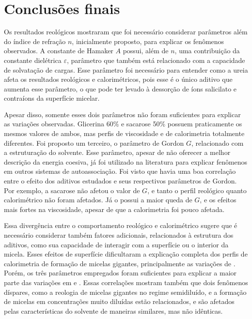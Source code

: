 \chapter{Conclusões finais}

	Os resultados reológicos mostraram que foi necessário considerar parâmetros além do índice de refração \(n\), inicialmente proposto, para explicar os fenômenos observados. A constante de Hamaker \(A\) possui, além de \(n\), uma contribuição da constante dielétrica \(\varepsilon\), parâmetro que também está relacionado com a capacidade de solvatação de cargas. Esse parâmetro foi necessário para entender como a ureia afeta os resultados reológicos e calorimétricos, pois esse é o único aditivo que aumenta esse parâmetro, o que pode ter levado à dessorção de íons salicilato e contraíons da superfície micelar.
	
	Apesar disso, somente esses dois parâmetros não foram suficientes para explicar as variações observadas. Glicerina 60\% e sacarose 50\% possuem praticamente os mesmos valores de ambos, mas perfis de viscosidade e de calorimetria totalmente diferentes. Foi proposto um terceiro, o parâmetro de Gordon \(G\), relacionado com a estruturação do solvente. Esse parâmetro, apesar de não oferecer a melhor descrição da energia coesiva, já foi utilizado na literatura para explicar fenômenos em outros sistemas de autoassociação. Foi visto que havia uma boa correlação entre o efeito dos aditivos estudados e seus respectivos parâmetros de Gordon. Por exemplo, a sacarose não afetou o valor de \(G\), e tanto o perfil reológico quanto calorimétrico não foram afetados. Já o \BD{} possui a maior queda de \(G\), e os efeitos mais fortes na viscosidade, apesar de que a calorimetria foi pouco afetada.
	
	Essa divergência entre o comportamento reológico e calorimétrico sugere que é necessário considerar também fatores adicionais, relacionados à estrutura dos aditivos, como sua capacidade de interagir com a superfície ou o interior da micela. Esses efeitos de superfície dificultaram a explicação completa dos perfis de calorimetria de formação de micelas gigantes, principalmente as variações de \DHwlm. Porém, os três parâmetros empregados foram suficientes para explicar a maior parte das variações em \cmc{} e \DHmic. Essas correlações mostram também que dois fenômenos díspares, como a reologia de micelas gigantes no regime semidiluído, e a formação de micelas em concentrações muito diluídas estão relacionados, e são afetados pelas características do solvente de maneiras similares, mas não idênticas.
	
